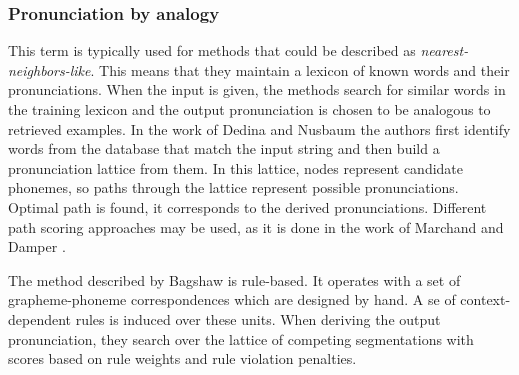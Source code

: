 \subsubsection{Pronunciation by analogy}
This term is typically used for methods that could be described as \textit{nearest-neighbors-like}.
This means that they maintain a lexicon of known words and their pronunciations.
When the input is given, the methods search for similar words in the training lexicon and the output pronunciation is chosen to be analogous to retrieved examples. 
In the work of Dedina and Nusbaum \cite{dedina1991pronounce} the authors first identify words from the database that match the input string and then build a pronunciation lattice from them.
In this lattice, nodes represent candidate phonemes, so paths through the lattice represent possible pronunciations.
Optimal path is found, it corresponds to the derived pronunciations.
Different path scoring approaches may be used, as it is done in the work of Marchand and Damper \citep{marchand2000multistrategy}.
\par
The method described by Bagshaw \cite{bagshaw1998phonemic} is rule-based.
It operates with a set of grapheme-phoneme correspondences which are designed by hand.
A se of context-dependent rules is induced over these units.
When deriving the output pronunciation, they search over the lattice of competing segmentations with scores based on rule weights and rule violation penalties.
\par
